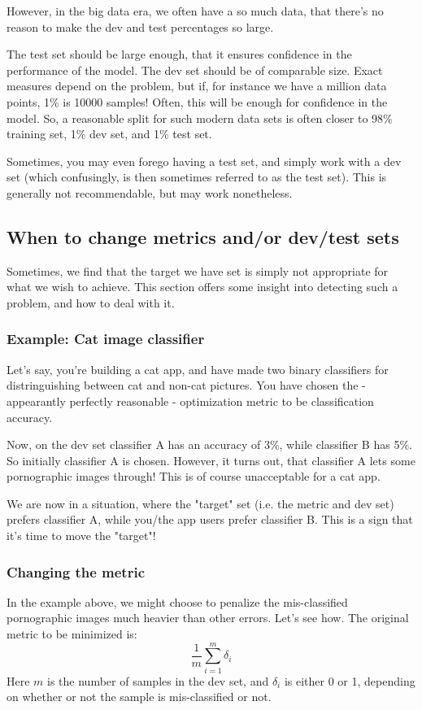 \documentclass[12pt, a4paper]{article}
\numberwithin{equation}{section}
\begin{document}
However, in the big data era, we often have a so much data, that there's no reason to make the dev and test percentages so large.

The test set should be large enough, that it ensures confidence in the performance of the model. The dev set should be of comparable size. Exact measures depend on the problem, but if, for instance we have a million data points, 1\% is 10000 samples! Often, this will be enough for confidence in the model. So, a reasonable split for such modern data sets is often closer to 98\% training set, 1\% dev set, and 1\% test set.

Sometimes, you may even forego having a test set, and simply work with a dev set (which confusingly, is then sometimes referred to as the test set). This is generally not recommendable, but may work nonetheless.

\subsection{When to change metrics and/or dev/test sets}
Sometimes, we find that the target we have set is simply not appropriate for what we wish to achieve. This section offers some insight into detecting such a problem, and how to deal with it.

\subsubsection{Example: Cat image classifier}
Let's say, you're building a cat app, and have made two binary classifiers for distringuishing between cat and non-cat pictures. You have chosen the - appearantly perfectly reasonable - optimization metric to be classification accuracy.

Now, on the dev set classifier A has an accuracy of 3\%, while classifier B has 5\%. So initially classifier A is chosen. However, it turns out, that classifier A lets some pornographic images through! This is of course unacceptable for a cat app.

We are now in a situation, where the "target" set (i.e. the metric and dev set) prefers classifier A, while you/the app users prefer classifier B. This is a sign that it's time to move the "target"!

\subsubsection{Changing the metric}
In the example above, we might choose to penalize the mis-classified pornographic images much heavier than other errors. Let's see how. The original metric to be minimized is:
\begin{equation}
\frac{1}{m}\sum_{i=1}^m\delta_i
\end{equation}
Here $m$ is the number of samples in the dev set, and $\delta_i$ is either 0 or 1, depending on whether or not the sample is mis-classified or not.
\end{document}
